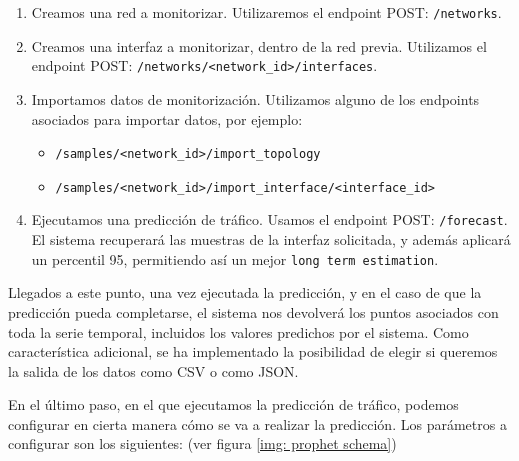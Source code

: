\documentclass[a4paper, oneside, 12pt]{book}
\begin{document}
	\begin{enumerate}
		\item Creamos una red a monitorizar. Utilizaremos el endpoint POST: \texttt{/networks}.
		
		\item Creamos una interfaz a monitorizar, dentro de la red previa. Utilizamos el endpoint POST: \texttt{/networks/<network\_id>/interfaces}.
		
		\item Importamos datos de monitorización. Utilizamos alguno de los endpoints asociados para importar datos, por ejemplo: 
		\begin{itemize}
			\item \texttt{/samples/<network\_id>/import\_topology}
			
			\item \texttt{/samples/<network\_id>/import\_interface/<interface\_id>}
		\end{itemize}
	
		\item Ejecutamos una predicción de tráfico. Usamos el endpoint POST: \texttt{/forecast}. El sistema recuperará las muestras de la interfaz solicitada, y además aplicará un percentil 95, permitiendo así un mejor \texttt{long term estimation}.
	\end{enumerate}

	\noindent Llegados a este punto, una vez ejecutada la predicción, y en el caso de que la predicción pueda completarse, el sistema nos devolverá los puntos asociados con toda la serie temporal, incluidos los valores predichos por el sistema. Como característica adicional, se ha implementado la posibilidad de elegir si queremos la salida de los datos como CSV o como JSON.

	\pagebreak

	\noindent En el último paso, en el que ejecutamos la predicción de tráfico, podemos configurar en cierta manera cómo se va a realizar la predicción. Los parámetros a configurar son los siguientes: (ver figura \ref{img: prophet schema})
	
\end{document}
